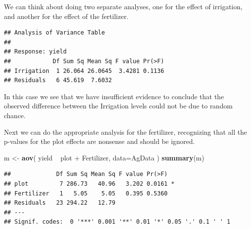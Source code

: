 \documentclass[]{book}
\newenvironment{Shaded}{\begin{snugshade}}{\end{snugshade}}
\newcommand{\KeywordTok}[1]{\textcolor[rgb]{0.13,0.29,0.53}{\textbf{{#1}}}}
\newcommand{\DataTypeTok}[1]{\textcolor[rgb]{0.13,0.29,0.53}{{#1}}}
\newcommand{\StringTok}[1]{\textcolor[rgb]{0.31,0.60,0.02}{{#1}}}
\newcommand{\CommentTok}[1]{\textcolor[rgb]{0.56,0.35,0.01}{\textit{{#1}}}}
\newcommand{\NormalTok}[1]{{#1}}
\theoremstyle{definition}
\theoremstyle{definition}
\theoremstyle{remark}
\begin{document}
We can think about doing two separate analyses, one for the effect of
irrigation, and another for the effect of the fertilizer.

\begin{Shaded}
\end{Shaded}

\begin{verbatim}
## Analysis of Variance Table
## 
## Response: yield
##            Df Sum Sq Mean Sq F value Pr(>F)
## Irrigation  1 26.064 26.0645  3.4281 0.1136
## Residuals   6 45.619  7.6032
\end{verbatim}

In this case we see that we have insufficient evidence to conclude that
the observed difference between the Irrigation levels could not be due
to random chance.

Next we can do the appropriate analysis for the fertilizer, recognizing
that all the p-values for the plot effects are nonsense and should be
ignored.

\begin{Shaded}
\begin{Highlighting}[]
\NormalTok{m <-}\StringTok{ }\KeywordTok{aov}\NormalTok{( yield ~}\StringTok{ }\NormalTok{plot +}\StringTok{ }\NormalTok{Fertilizer, }\DataTypeTok{data=}\NormalTok{AgData )}
\KeywordTok{summary}\NormalTok{(m)}
\end{Highlighting}
\end{Shaded}

\begin{verbatim}
##             Df Sum Sq Mean Sq F value Pr(>F)  
## plot         7 286.73   40.96   3.202 0.0161 *
## Fertilizer   1   5.05    5.05   0.395 0.5360  
## Residuals   23 294.22   12.79                 
## ---
## Signif. codes:  0 '***' 0.001 '**' 0.01 '*' 0.05 '.' 0.1 ' ' 1
\end{verbatim}
\end{document}
